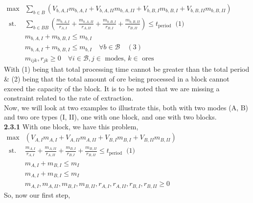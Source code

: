 \documentclass[11pt]{article}
\begin{document}
$\begin{aligned} 
    \max & \sum_{b \in B}\left(V_{b, A, I} m_{b, A, I}+V_{b, A, II} m_{b, A, II}+V_{b, B, I} m_{b, B, I}+V_{b, B, II} m_{b, B, II}\right) \\ 
    \text { st. } & \sum_{b \in B B}\left(\frac{m_{b, A, I}}{r_{A, I}}+\frac{m_{b, A, II}}{r_{A, II}}+\frac{m_{b, B, I}}{r_{B, I}}+\frac{m_{b, B, II}}{r_{B, II}}\right) \leqslant t_{\text {period }} \text { (1) } \\ 
    & m_{b, A, I}+m_{b, B, I} \leqslant m_{b, I}  \\ 
    & m_{b, A, I}+m_{b, B, I} \leqslant m_{b, I}  \quad \forall b \in \mathcal{B} \quad(3) \\ 
    & m_{i j k}, r_{j k} \geqslant 0 \quad \forall i \in \mathcal{B}, j \in \text { modes, } k \in \text { ores }
\end{aligned}$
\\

\noindent With (1) being that total processing time cannot be greater than the total period & (2) being that the total amount of ore being processed in a block cannot exceed the capacity of the block. It is to be noted that we are missing a constraint related to the rate of extraction.
\\

\noindent Now, we will look at two examples to illustrate this, both with two modes (A, B) and two ore types (I, II), one with one block, and one with two blocks. 
\\

\noindent \textbf{2.3.1} With one block, we have this problem, 
\\

$\begin{aligned} 
    \max & \left(V_{A, I} m_{A, I}+V_{A, II} m_{A, II}+V_{B, I} m_{B, I}+V_{B, II} m_{B, II}\right) \\ 
    \text { st. } &   \frac{m_{A, I}}{r_{A, I}}+\frac{m_{A, II}}{r_{A, II}}+\frac{m_{B, I}}{r_{B, I}}+\frac{m_{B, II}}{r_{B, II}} \leqslant t_{\text {period }} \text { (1) } \\ 
    & m_{A, I}+m_{B, I} \leqslant m_{I}  \\ 
    & m_{A, I}+m_{B, I} \leqslant m_{I}  \\ 
    & m_{A, I}, m_{A, II}, m_{B, I}, m_{B, II}, r_{A, I}, r_{A, II}, r_{B, I}, r_{B, II} \geqslant 0
\end{aligned}$
\\

\noindent So, now our first step, 
\end{document}
